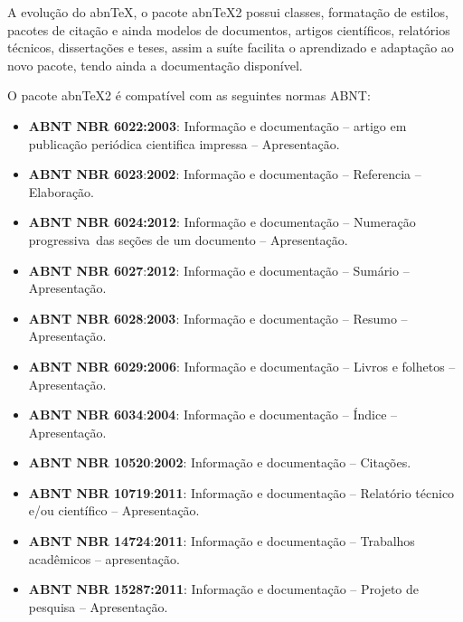 {
A evolu\c{c}\~ao do abnTeX, o pacote abnTeX2 possui classes, formata\c{c}\~ao de estilos, pacotes de cita\c{c}\~ao e
ainda modelos de documentos, artigos cient\'ificos, relat\'orios t\'ecnicos, disserta\c{c}\~oes e teses, assim a
su\'ite facilita o aprendizado e adapta\c{c}\~ao ao novo pacote, tendo ainda a documenta\c{c}\~ao dispon\'ivel.}

{
O pacote abnTeX2 \'e compat\'ivel com as seguintes normas ABNT:}

\liststyleLFOiv
\begin{itemize}
\item {
\textrm{\textbf{ABNT NBR 6022:2003}}\textrm{: Informa\c{c}\~ao e documenta\c{c}\~ao -- artigo em publica\c{c}\~ao
peri\'odica cientifica impressa -- Apresenta\c{c}\~ao.}}
\item {
\textrm{\textbf{ABNT NBR 6023}}\textrm{:}\textrm{\textbf{2002}}\textrm{: Informa\c{c}\~ao e documenta\c{c}\~ao --
Referencia -- Elabora\c{c}\~ao.}}
\item {
\textrm{\textbf{ABNT NBR 6024:2012}}\textrm{: Informa\c{c}\~ao e documenta\c{c}\~ao -- Numera\c{c}\~ao progressiva\ das
se\c{c}\~oes de um documento -- Apresenta\c{c}\~ao.}}
\item {
\textrm{\textbf{ABNT NBR 6027}}\textrm{:}\textrm{\textbf{2012}}\textrm{: Informa\c{c}\~ao e documenta\c{c}\~ao --
Sum\'ario -- Apresenta\c{c}\~ao.}}
\item {
\textrm{\textbf{ABNT NBR 6028}}\textrm{:}\textrm{\textbf{2003}}\textrm{: Informa\c{c}\~ao e documenta\c{c}\~ao -- Resumo
-- Apresenta\c{c}\~ao.}}
\item {
\textrm{\textbf{ABNT NBR 6029:2006}}\textrm{: Informa\c{c}\~ao e documenta\c{c}\~ao -- Livros e folhetos --
Apresenta\c{c}\~ao.}}
\item {
\textrm{\textbf{ABNT NBR 6034}}\textrm{:}\textrm{\textbf{2004}}\textrm{: Informa\c{c}\~ao e documenta\c{c}\~ao --
\'Indice -- Apresenta\c{c}\~ao.}}
\item {
\textrm{\textbf{ABNT NBR 10520}}\textrm{:}\textrm{\textbf{2002}}\textrm{: Informa\c{c}\~ao e documenta\c{c}\~ao --
Cita\c{c}\~oes.}}
\item {
\textrm{\textbf{ABNT NBR 10719}}\textrm{:}\textrm{\textbf{2011}}\textrm{: Informa\c{c}\~ao e documenta\c{c}\~ao --
Relat\'orio t\'ecnico e/ou cient\'ifico -- Apresenta\c{c}\~ao. \ \ }}
\item {
\textrm{\textbf{ABNT NBR 14724}}\textrm{:}\textrm{\textbf{2011}}\textrm{: Informa\c{c}\~ao e documenta\c{c}\~ao --
Trabalhos acad\^emicos -- apresenta\c{c}\~ao.}}
\item {
\textrm{\textbf{ABNT NBR 15287:2011}}\textrm{: Informa\c{c}\~ao e documenta\c{c}\~ao -- Projeto de pesquisa --
Apresenta\c{c}\~ao.}}
\end{itemize}

